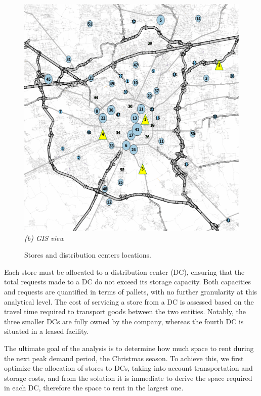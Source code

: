 \documentclass[opre,sglanonrev,11pt]{informs4}
\begin{document}
\begin{figure}[ht]
\begin{minipage}{0.48\textwidth}
		\includegraphics[width=\linewidth]{qgis.png}
		\vspace{0.5em}
		\textit{(b) GIS view}
	\end{minipage}
	\caption{Stores and distribution centers locations.}
	\label{fig:locations}
\end{figure}

Each store must be allocated to a distribution center (DC), ensuring that the total requests made to a DC do not exceed its storage capacity. Both capacities and requests are quantified in terms of pallets, with no further granularity at this analytical level. The cost of servicing a store from a DC is assessed based on the travel time required to transport goods between the two entities. Notably, the three smaller DCs are fully owned by the company, whereas the fourth DC is situated in a leased facility.

The ultimate goal of the analysis is to determine how much space to rent during the next peak demand period, the Christmas season. To achieve this, we first optimize the allocation of stores to DCs, taking into account transportation and storage costs, and from the solution it is immediate to derive the space required in each DC, therefore the space to rent in the largest one.
\end{document}
